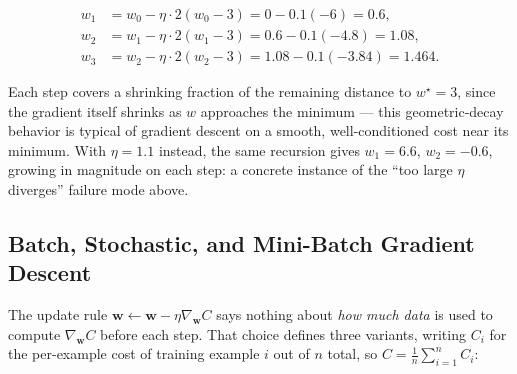 \documentclass[11pt]{article}
\begin{document}
\[
\begin{aligned}
  w_1 &= w_0 - \eta \cdot 2(w_0 - 3) = 0 - 0.1(-6) = 0.6, \\
  w_2 &= w_1 - \eta \cdot 2(w_1 - 3) = 0.6 - 0.1(-4.8) = 1.08, \\
  w_3 &= w_2 - \eta \cdot 2(w_2 - 3) = 1.08 - 0.1(-3.84) = 1.464.
\end{aligned}
\]

Each step covers a shrinking fraction of the remaining distance to
$w^\star = 3$, since the gradient itself shrinks as $w$ approaches the
minimum --- this geometric-decay behavior is typical of gradient descent
on a smooth, well-conditioned cost near its minimum. With
$\eta = 1.1$ instead, the same recursion gives $w_1 = 6.6$,
$w_2 = -0.6$, growing in magnitude on each step: a concrete instance of
the ``too large $\eta$ diverges'' failure mode above.

\subsection{Batch, Stochastic, and Mini-Batch Gradient Descent}

The update rule $\mathbf{w} \gets \mathbf{w} - \eta \nabla_{\mathbf{w}} C$
says nothing about \emph{how much data} is used to compute
$\nabla_{\mathbf{w}} C$ before each step. That choice defines three
variants, writing $C_i$ for the per-example cost of training example $i$
out of $n$ total, so $C = \frac{1}{n}\sum_{i=1}^n C_i$:
\end{document}
